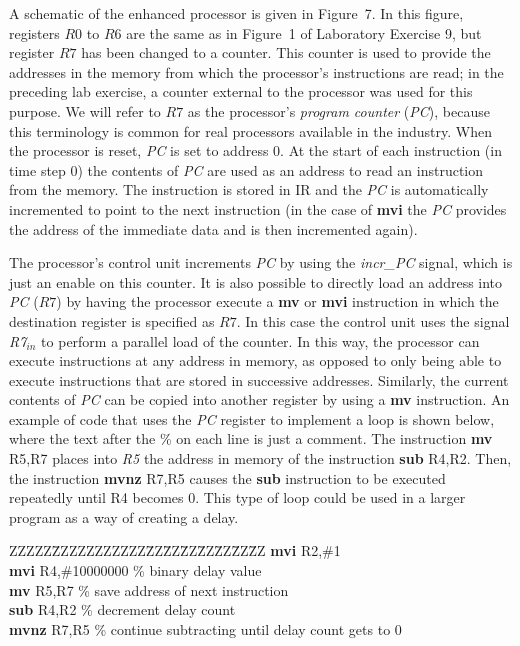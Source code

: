 \documentclass[epsfig,10pt,fullpage]{article}
\begin{document}
A schematic of the enhanced processor is given in Figure~7. In this figure,
registers $R0$ to $R6$ are the same as in Figure~1 of Laboratory Exercise 9, but 
register $R7$ has been changed
to a counter. This counter is used to provide the addresses in the memory from which the
processor's instructions are read; in the preceding lab exercise, a counter 
external to the processor was
used for this purpose. We will refer to $R7$ as the processor's 
{\it program counter} ({\it PC}), because this terminology is common for real processors
available in the industry. When the processor is reset, {\it PC} is set to address 0. At the
start of each instruction (in time step 0) the contents of {\it PC} are used as an address to
read an instruction from the memory. The instruction is stored in IR and 
the {\it PC} is automatically incremented to point to the next instruction (in the case of {\bf
mvi}
the {\it PC} provides the address of the immediate data and is then incremented again). 

The processor's control unit increments {\it PC} by using the {\it incr\_PC} signal, which is
just an enable on this counter. It is also
possible to directly load an address into {\it PC} ($R7$) by having the processor execute a {\bf
mv} or {\bf mvi}
instruction in which the destination register is specified as $R7$. In this case the control
unit uses the signal {\it R7}$_{in}$ to perform a parallel load of the counter. In this way, the
processor can execute instructions at any address in memory, as opposed to only being able
to execute instructions that are stored in successive addresses. Similarly, the current 
contents of {\it PC} can be copied into another register by using a {\bf mv} instruction. An example
of code that uses the {\it PC} register to implement a loop is shown below, where the 
text after the \% on each line is just a comment. The instruction
{\bf mv} R5,R7 places into {\it R5} the address in memory of the instruction {\bf sub} R4,R2.
Then, the instruction 
{\bf mvnz} R7,R5 causes the {\bf sub} instruction to be executed repeatedly until R4 becomes 0.
This type of loop could be used in a larger program as a way of creating a delay. 
~\\
\begin{center}
\begin{minipage}[t]{12.5 cm}
\begin{tabbing}
ZZZZZ\=ZZZZZZZZZZZ\=ZZ\=ZZ\=ZZ\=ZZ\=ZZ\=ZZ\=ZZ\kill
{\bf mvi} \>R2,\#1 \\
{\bf mvi} \>R4,\#10000000 \>\% binary delay value\\
{\bf mv} \>R5,R7 \>\% save address of next instruction\\
{\bf sub} \>R4,R2 \>\% decrement delay count\\
{\bf mvnz} \>R7,R5 \>\% continue subtracting until delay count gets to 0\\
\end{tabbing}
\end{minipage}
\end{center}
\end{document}
